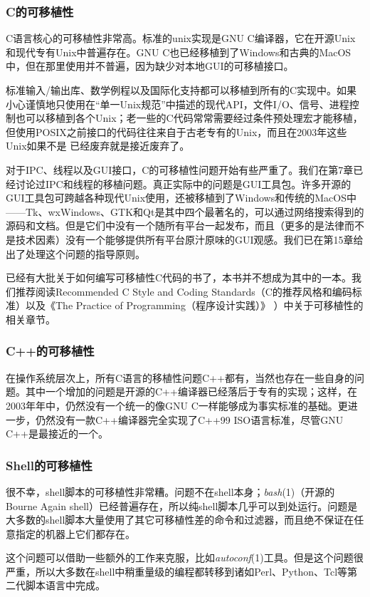 \documentclass[12pt,oneside]{book}
\begin{document}
\begin{common-format}
\subsubsection{C的可移植性}
C语言核心的可移植性非常高。标准的unix实现是GNU C编译器，它在开源Unix和现代专有Unix中普遍存在。GNU C也已经移植到了Windows和古典的MacOS中，但在那里使用并不普遍，因为缺少对本地GUI的可移植接口。

标准输入/输出库、数学例程以及国际化支持都可以移植到所有的C实现中。如果小心谨慎地只使用在“单一Unix规范”中描述的现代API，文件I/O、信号、进程控制也可以移植到各个Unix；老一些的C代码常常需要经过条件预处理宏才能移植，但使用POSIX之前接口的代码往往来自于古老专有的Unix，而且在2003年这些Unix如果不是
已经废弃就是接近废弃了。

对于IPC、线程以及GUI接口，C的可移植性问题开始有些严重了。我们在第7章已经讨论过IPC和线程的移植问题。真正实际中的问题是GUI工具包。许多开源的GUI工具包可跨越各种现代Unix使用，还被移植到了Windows和传统的MacOS中——Tk、wxWindows、GTK和Qt是其中四个最著名的，可以通过网络搜索得到的源码和文档。但是它们中没有一个随所有平台一起发布，而且（更多的是法律而不是技术因素）没有一个能够提供所有平台原汁原味的GUI观感。我们已在第15章给出了处理这个问题的指导原则。

已经有大批关于如何编写可移植性C代码的书了，本书并不想成为其中的一本。我们推荐阅读Recommended C Style and Coding Standards（C的推荐风格和编码标准）\cite{Cannon}以及《The Practice of Programming（程序设计实践）》 \cite{Kernighan-Pike99}）中关于可移植性的相关章节。

\subsubsection{C++的可移植性}
在操作系统层次上，所有C语言的移植性问题C++都有，当然也存在一些自身的问题。其中一个增加的问题是开源的C++编译器已经落后于专有的实现；这样，在2003年年中，仍然没有一个统一的像GNU C一样能够成为事实标准的基础。更进一步，仍然没有一款C++编译器完全实现了C++99 ISO语言标准，尽管GNU C++是最接近的一个。

\subsubsection{Shell的可移植性}
很不幸，shell脚本的可移植性非常糟。问题不在shell本身；\textit{bash}(1)（开源的Bourne Again shell）已经普遍存在，所以纯shell脚本几乎可以到处运行。问题是大多数的shell脚本大量使用了其它可移植性差的命令和过滤器，而且绝不保证在任意指定的机器上它们都存在。

这个问题可以借助一些额外的工作来克服，比如\textit{autoconf}(1)工具。但是这个问题很严重，所以大多数在shell中稍重量级的编程都转移到诸如Perl、Python、Tcl等第二代脚本语言中完成。


\end{common-format}
\end{document}
